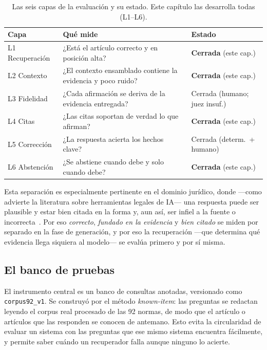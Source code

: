 \begin{table}[htbp]
    \centering
    \small
    \renewcommand{\arraystretch}{1.2}
    \caption{Las seis capas de la evaluación y su estado. Este capítulo las desarrolla todas (L1--L6).}
    \label{tab:capas-eval}
    \begin{tabular}{p{1.6cm}p{8.6cm}p{3.0cm}}
        \toprule
        \textbf{Capa} & \textbf{Qué mide} & \textbf{Estado} \\
        \midrule
        L1 Recuperación & ¿Está el artículo correcto y en posición alta? & \textbf{Cerrada} (este cap.) \\
        L2 Contexto & ¿El contexto ensamblado contiene la evidencia y poco ruido? & \textbf{Cerrada} (este cap.) \\
        L3 Fidelidad & ¿Cada afirmación se deriva de la evidencia entregada? & Cerrada (humano; juez insuf.) \\
        L4 Citas & ¿Las citas soportan de verdad lo que afirman? & \textbf{Cerrada} (este cap.) \\
        L5 Corrección & ¿La respuesta acierta los hechos clave? & Cerrada (determ.\ + humano) \\
        L6 Abstención & ¿Se abstiene cuando debe y solo cuando debe? & \textbf{Cerrada} (este cap.) \\
        \bottomrule
    \end{tabular}
\end{table}

Esta separación es especialmente pertinente en el dominio jurídico, donde —como advierte la literatura sobre herramientas legales de IA— una respuesta puede ser plausible y estar bien citada en la forma y, aun así, ser infiel a la fuente o incorrecta~\cite{magesh2025hallucinationfree}. Por eso \emph{correcto}, \emph{fundado en la evidencia} y \emph{bien citado} se miden por separado en la fase de generación, y por eso la recuperación —que determina qué evidencia llega siquiera al modelo— se evalúa primero y por sí misma.

\subsection{El banco de pruebas}
\label{subsec:banco}

El instrumento central es un banco de consultas anotadas, versionado como \texttt{corpus92\_v1}. Se construyó por el método \emph{known-item}: las preguntas se redactan leyendo el corpus real procesado de las 92 normas, de modo que el artículo o artículos que las responden se conocen de antemano. Esto evita la circularidad de evaluar un sistema con las preguntas que ese mismo sistema encuentra fácilmente, y permite saber cuándo un recuperador falla aunque ninguno lo acierte.

